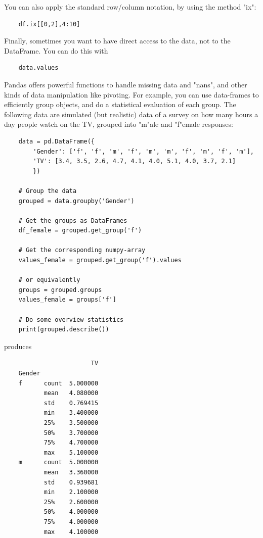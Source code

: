 You can also apply the standard row/column notation, by using the method "ix":

\begin{lstlisting}
    df.ix[[0,2],4:10]
\end{lstlisting}

Finally, sometimes you want to have direct access to the data, not to the DataFrame. You can do this with

\begin{lstlisting}
    data.values
\end{lstlisting}

Pandas offers powerful functions to handle missing data and "nans", and other kinds of data manipulation like pivoting.
For example, you can use data-frames to efficiently group objects, and do a statistical evaluation of each group. The following data are simulated (but realistic) data of a survey on how many hours a day people watch on the TV, grouped into "m"ale and "f"emale responses:

\begin{lstlisting}
    data = pd.DataFrame({
        'Gender': ['f', 'f', 'm', 'f', 'm', 'm', 'f', 'm', 'f', 'm'],
        'TV': [3.4, 3.5, 2.6, 4.7, 4.1, 4.0, 5.1, 4.0, 3.7, 2.1]
        })

    # Group the data
    grouped = data.groupby('Gender')

    # Get the groups as DataFrames
    df_female = grouped.get_group('f')

    # Get the corresponding numpy-array
    values_female = grouped.get_group('f').values

    # or equivalently
    groups = grouped.groups
    values_female = groups['f']

    # Do some overview statistics
    print(grouped.describe())
\end{lstlisting}

produces

\begin{lstlisting}
                        TV
    Gender
    f      count  5.000000
           mean   4.080000
           std    0.769415
           min    3.400000
           25%    3.500000
           50%    3.700000
           75%    4.700000
           max    5.100000
    m      count  5.000000
           mean   3.360000
           std    0.939681
           min    2.100000
           25%    2.600000
           50%    4.000000
           75%    4.000000
           max    4.100000
\end{lstlisting}


